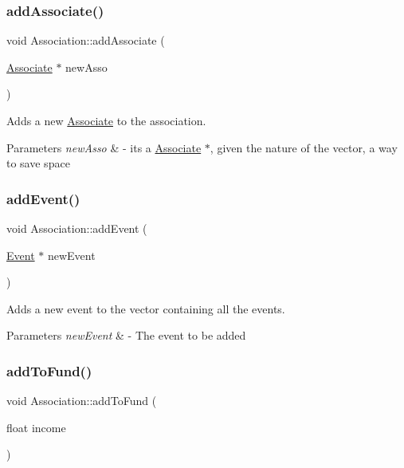 \subsubsection{\texorpdfstring{add\+Associate()}{addAssociate()}}
{\footnotesize\ttfamily void Association\+::add\+Associate (\begin{DoxyParamCaption}\item[{\mbox{\hyperlink{classAssociate}{Associate}} $\ast$}]{new\+Asso }\end{DoxyParamCaption})}



Adds a new \mbox{\hyperlink{classAssociate}{Associate}} to the association. 


\begin{DoxyParams}{Parameters}
{\em new\+Asso} & -\/ it\textquotesingle{}s a \mbox{\hyperlink{classAssociate}{Associate}} $\ast$, given the nature of the vector, a way to save space \\
\hline
\end{DoxyParams}
\mbox{\label{classAssociation_a047b29b0d39da0695de0200ad495dee1}} 
\subsubsection{\texorpdfstring{add\+Event()}{addEvent()}}
{\footnotesize\ttfamily void Association\+::add\+Event (\begin{DoxyParamCaption}\item[{\mbox{\hyperlink{classEvent}{Event}} $\ast$}]{new\+Event }\end{DoxyParamCaption})}



Adds a new event to the vector containing all the events. 


\begin{DoxyParams}{Parameters}
{\em new\+Event} & -\/ The event to be added \\
\hline
\end{DoxyParams}
\mbox{\label{classAssociation_a48cf9a1d1e3d2e0e588cbbe7d2d5cd3b}} 
\subsubsection{\texorpdfstring{add\+To\+Fund()}{addToFund()}}
{\footnotesize\ttfamily void Association\+::add\+To\+Fund (\begin{DoxyParamCaption}\item[{float}]{income }\end{DoxyParamCaption})}



